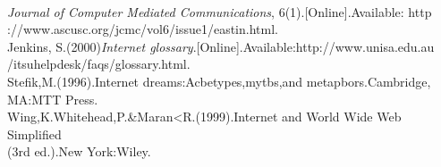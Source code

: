 \documentclass{book}
\begin{document}
\\\hspace*{0.5cm}\emph{Journal of Computer Mediated Communications}, 6(1).[Online].Available: http
\\\hspace*{0.5cm}://www.ascusc.org/jcmc/vol6/issue1/eastin.html.
\\Jenkins, S.(2000)\emph{Internet glossary}.[Online].Available:http://www.unisa.edu.au
\\\hspace*{0.5cm}/itsuhelpdesk/faqs/glossary.html.
\\Stefik,M.(1996).Internet dreams:Acbetypes,mytbs,and metapbors.Cambridge,
\\\hspace*{0.5cm}MA:MTT Press.
\\Wing,K.Whitehead,P.&Maran<R.(1999).Internet and World Wide Web Simplified
\\\hspace*{0.5cm}(3rd ed.).New York:Wiley.
\end{document}
